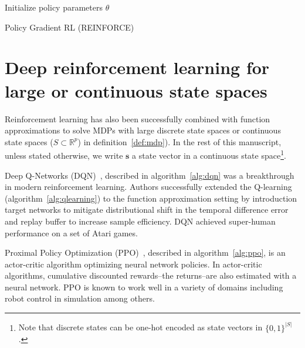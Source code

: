 \begin{algorithm}
    Initialize policy parameters $\theta$ \\
    \caption{Policy Gradient RL (REINFORCE)}\label{alg:reinforce}
\end{algorithm}


\section{Deep reinforcement learning for large or continuous state spaces}\label{sec:drl}

Reinforcement learning has also been successfully combined with function approximations to solve MDPs with large discrete state spaces or continuous state spaces ($S\subset \mathbb{R}^p$) in definition~\ref{def:mdp}).
In the rest of this manuscript, unless stated otherwise, we write $\boldsymbol{s}$ a state vector in a continuous state space\footnote{Note that discrete states can be one-hot encoded as state vectors in $\{0, 1\}^{|S|}$.}.

Deep Q-Networks (DQN)~\cite{dqn}, described in algorithm~\ref{alg:dqn} was a breakthrough in modern reinforcement learning.
Authors successfully extended the Q-learning (algorithm~\ref{alg:qlearning}) to the function approximation setting by introduction target networks to mitigate distributional shift in the temporal difference error and replay buffer to increase sample efficiency.
DQN achieved super-human performance on a set of Atari games.

Proximal Policy Optimization (PPO)~\cite{ppo}, described in algorithm~\ref{alg:ppo}, is an actor-critic algorithm\cite{pg_sutton} optimizing neural network policies. 
In actor-critic algorithms, cumulative discounted rewards--the returns--are also estimated with a neural network. 
PPO is known to work well in a variety of domains including robot control in simulation among others.

